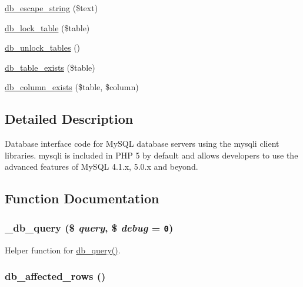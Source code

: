 \begin{Indent}{\bf }
\begin{CompactItemize}
\hyperlink{database_8mysqli_8inc_f7e6977f59f6a23327521ae3a89346f5}{db\_\-escape\_\-string} (\$text)
\item 
\hyperlink{database_8mysqli_8inc_8584042b05393a82b7d06c2ee6cf95ed}{db\_\-lock\_\-table} (\$table)
\item 
\hyperlink{database_8mysqli_8inc_827df02252c1d606c685b768807b7181}{db\_\-unlock\_\-tables} ()
\item 
\hyperlink{database_8mysqli_8inc_78809300cee80db034832825aed55b70}{db\_\-table\_\-exists} (\$table)
\item 
\hyperlink{database_8mysqli_8inc_3d649bb8d8b9a7222c0bded9d7e2785a}{db\_\-column\_\-exists} (\$table, \$column)
\end{CompactItemize}
\end{Indent}


\subsection{Detailed Description}
Database interface code for MySQL database servers using the mysqli client libraries. mysqli is included in PHP 5 by default and allows developers to use the advanced features of MySQL 4.1.x, 5.0.x and beyond. 

\subsection{Function Documentation}
\hypertarget{database_8mysqli_8inc_f0a663e6a6aaf095f78a77c871b8028b}{
\subsubsection[{\_\-db\_\-query}]{\setlength{\rightskip}{0pt plus 5cm}\_\-db\_\-query (\$ {\em query}, \/  \$ {\em debug} = {\tt 0})}}
\label{database_8mysqli_8inc_f0a663e6a6aaf095f78a77c871b8028b}


Helper function for \hyperlink{database_8mysql-common_8inc_9e096321b86945d128746ac7bedce8f3}{db\_\-query()}. \hypertarget{database_8mysqli_8inc_e3bc677fbeebd688068ce3b413ac2944}{
\subsubsection[{db\_\-affected\_\-rows}]{\setlength{\rightskip}{0pt plus 5cm}db\_\-affected\_\-rows ()}}
\label{database_8mysqli_8inc_e3bc677fbeebd688068ce3b413ac2944}


